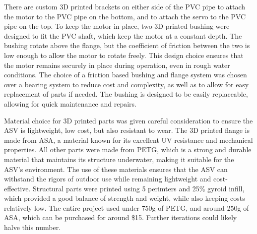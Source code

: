 There are custom 3D printed brackets on either side of the PVC pipe to attach the motor to the PVC pipe on the bottom, and to attach the servo to the PVC pipe on the top. To keep the motor in place, two 3D printed bushing were designed to fit the PVC shaft, which keep the motor at a constant depth. The bushing rotate above the flange, but the coefficient of friction between the two is low enough to allow the motor to rotate freely. This design choice ensures that the motor remains securely in place during operation, even in rough water conditions. The choice of a friction based bushing and flange system was chosen over a bearing system to reduce cost and complexity, as well as to allow for easy replacement of parts if needed. The bushing is designed to be easily replaceable, allowing for quick maintenance and repairs.

Material choice for 3D printed parts was given careful consideration to ensure the ASV is lightweight, low cost, but also resistant to wear. The 3D printed flange is made from ASA, a material known for its excellent UV resistance and mechanical properties. All other parts were made from PETG, which is a strong and durable material that maintains its structure underwater, making it suitable for the ASV's environment. The use of these materials ensures that the ASV can withstand the rigors of outdoor use while remaining lightweight and cost-effective. Structural parts were printed using 5 perimters and 25\% gyroid infill, which provided a good balance of strength and weight, while also keeping costs relatively low. The entire project used under 750g of PETG, and around 250g of ASA, which can be purchased for around \$15. Further iterations could likely halve this number.